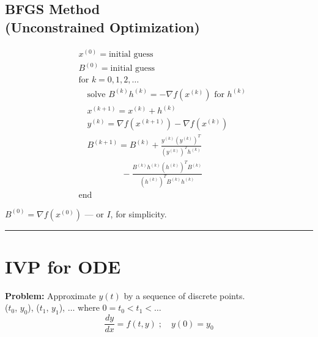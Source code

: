 \documentclass[9pt]{article}
\begin{document}
\begin{multicols}{3}
\subsection*{BFGS Method\\ \footnotesize{(Unconstrained Optimization)}}


\[
\boxed{
\begin{aligned}
    &x^{(0)} = \text{initial guess}\\
    &B^{(0)} = \text{initial guess}\\
    &\text{for } k = 0,1,2,\ldots\\
    & \quad \text{solve } B^{(k)}h^{(k)} = -\nabla f(x^{(k)}) \text{ for } h^{(k)}\\
    & \quad x^{(k+1)} = x^{(k)} + h^{(k)}\\
    & \quad y^{(k)} = \nabla f(x^{(k+1)}) - \nabla f(x^{(k)})\\
    & \quad B^{(k+1)} = B^{(k)} + \frac{{y^{(k)}(y^{(k)})^T}}{(y^{(k)})^Th^{(k)}}\\
    & \qquad \qquad \quad - \frac{B^{(k)}h^{(k)}(h^{(k)})^TB^{(k)}}{(h^{(k)})^T B^{(k)} h^{(k)}}\\
    &\text{end}
\end{aligned}
}
\]

$B^{(0)} = \nabla f(x^{(0)})$ --- or $I$, for simplicity.\\

\vspace{0.2cm}
\hrule
\vspace{-0.2cm}
\section{IVP for ODE}

\vspace{-0.1cm}
\textbf{Problem: } Approximate $y(t)$ by a sequence of discrete points.\\($t_0$, $y_0$), ($t_1$, $y_1 $), $\ldots$ where $0=t_0<t_1<\ldots$
\[
\frac{dy}{dx} = f(t, y) \; ; \quad y(0) = y_0
\]

\\


\end{multicols}
\end{document}
